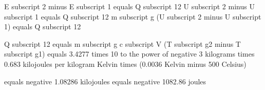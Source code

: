 E subscript 2 minus E subscript 1 equals Q subscript 12  
U subscript 2 minus U subscript 1 equals Q subscript 12  
m subscript g (U subscript 2 minus U subscript 1) equals Q subscript 12  

Q subscript 12 equals m subscript g c subscript V (T subscript g2 minus T subscript g1) equals 3.4277 times 10 to the power of negative 3 kilograms times 0.683 kilojoules per kilogram Kelvin times (0.0036 Kelvin minus 500 Celsius)  

equals negative 1.08286 kilojoules equals negative 1082.86 joules